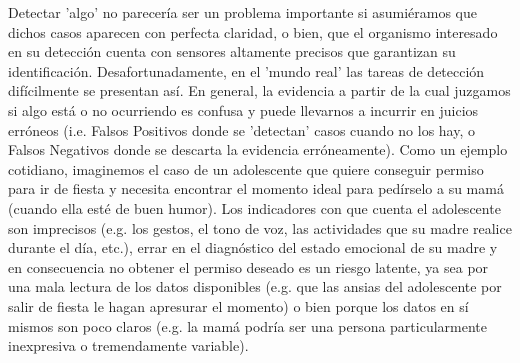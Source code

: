Detectar 'algo' no parecería ser un problema importante si asumiéramos que dichos casos aparecen con perfecta claridad, o bien, que el organismo interesado en su detección cuenta con sensores altamente precisos que garantizan su identificación. Desafortunadamente, en el 'mundo real' las tareas de detección difícilmente se presentan así. En general, la evidencia a partir de la cual juzgamos si algo está o no ocurriendo es confusa y puede llevarnos a incurrir en juicios erróneos (i.e. Falsos Positivos donde se 'detectan' casos cuando no los hay, o Falsos Negativos donde se descarta la evidencia erróneamente). Como un ejemplo cotidiano, imaginemos el caso de un adolescente que quiere conseguir permiso para ir de fiesta y necesita encontrar el momento ideal para pedírselo a su mamá (cuando ella esté de buen humor). Los indicadores con que cuenta el adolescente son imprecisos (e.g. los gestos, el tono de voz, las actividades que su madre realice durante el día, etc.), errar en el diagnóstico del estado emocional de su madre y en consecuencia no obtener el permiso deseado es un riesgo latente, ya sea por una mala lectura de los datos disponibles (e.g. que las ansias del adolescente por salir de fiesta le hagan apresurar el momento) o bien porque los datos en sí mismos son poco claros (e.g. la mamá podría ser una persona particularmente inexpresiva o tremendamente variable).\\ 

